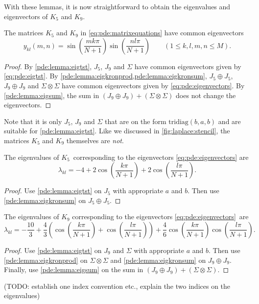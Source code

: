 With these lemmas, it is now straightforward to obtain the eigenvalues and eigenvectors of $K_5$ and $K_9$.

\newcommand{\eigvecexpr}{\sin \left( \frac{mk\pi}{N+1} \right) \sin \left( \frac{nl\pi}{N+1} \right)}
\begin{theorem}
	The matrices $K_5$ and $K_9$ in \cref{eq:pde:matrixequations} have common eigenvectors
	\begin{equation}
		y_{kl}(m,n)= \eigvecexpr \qquad (1 \leq k,l,m,n \leq M).
		\label{eq:pde:eigenvectors}
	\end{equation}
\end{theorem}
\begin{proof}
	By \cref{pde:lemma:eigtst}, $J_5$, $J_9$ and $\Sigma$ have common eigenvectors given by \cref{eq:pde:eigtst}.
	By \cref{pde:lemma:eigkronprod,pde:lemma:eigkronsum}, $J_5 \oplus J_5$, $J_9 \oplus J_9$ and $\Sigma \otimes \Sigma$ have common eigenvectors given by \cref{eq:pde:eigenvectors}.
	By \cref{pde:lemma:eigsum}, the sum in $(J_9 \oplus J_9) + (\Sigma \otimes \Sigma)$ does not change the eigenvectors.
\end{proof}
Note that it is only $J_5$, $J_9$ and $\Sigma$ that are on the form $\text{tridiag}(b,a,b)$ and are suitable for \cref{pde:lemma:eigtst}.
Like we discussed in \cref{fig:laplace:stencil}, the matrices $K_5$ and $K_9$ themselves are \emph{not}.
\begin{theorem}
The eigenvalues of $K_5$ corresponding to the eigenvectors \ref{eq:pde:eigenvectors} are
\begin{equation}
	\lambda_{kl} = -4 + 2 \cos \left( \frac{k\pi}{N+1} \right) + 2 \cos \left( \frac{l\pi}{N+1} \right).
	\label{eq:pde:eigvals5}
\end{equation}
\end{theorem}
\begin{proof}
	Use \cref{pde:lemma:eigtst} on $J_5$ with appropriate $a$ and $b$.
	Then use \cref{pde:lemma:eigkronsum} on $J_5 \oplus J_5$.
\end{proof}
\begin{theorem}
The eigenvalues of $K_9$ corresponding to the eigenvectors \ref{eq:pde:eigenvectors} are
\begin{equation}
  \lambda_{kl} = -\frac{10}{3} + \frac43 \left( 
                   \cos\left(\frac{k \pi}{N+1}\right) + \cos\left(\frac{l \pi}{N+1}\right) 
               \right) + \frac46 \cos\left(\frac{k \pi}{N+1}\right) \cos\left(\frac{l \pi}{N+1}\right).
  \label{eq:pde:eigvals9}
\end{equation}
\end{theorem}
\begin{proof}
	Use \cref{pde:lemma:eigtst} on $J_9$ and $\Sigma$ with appropriate $a$ and $b$.
	Then use \cref{pde:lemma:eigkronprod} on $\Sigma \otimes \Sigma$ and \cref{pde:lemma:eigkronsum} on $J_9 \oplus J_9$.
	Finally, use \cref{pde:lemma:eigsum} on the sum in $(J_9 \oplus J_9) + (\Sigma \otimes \Sigma)$.
\end{proof}
(TODO: establish one index convention etc., explain the two indices on the eigenvalues)

